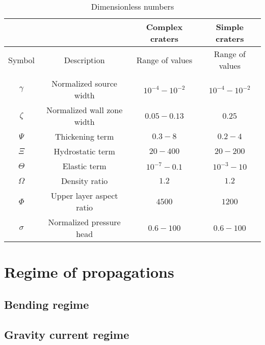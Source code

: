 	 
\begin{table}
  \caption{Dimensionless numbers}
  \centering
  \begin{tabular}{c|c|c|c}
    &&Complex craters&Simple craters \\
    \hline
    Symbol& Description & Range of values & Range of values \\
    \hline
    &&\\
    $\gamma$&Normalized source width& $10^{-4}-10^{-2}$ &$10^{-4}-10^{-2}$ \\
    $\zeta$& Normalized wall zone width  & $0.05-0.13$&$0.25$\\
    $\Psi$&Thickening term & $0.3-8$&$0.2-4$\\
    $\Xi$& Hydrostatic term & $20-400$&$20-200$\\
    $\Theta$ &Elastic term & $10^{-7}-0.1$&$10^{-3}-10$\\
    $\Omega$ & Density ratio & $1.2$ &$1.2$\\
    $\Phi$ & Upper layer aspect ratio & $4500$ &$1200 $\\
    $\sigma$&Normalized pressure head& $0.6-100$ & $0.6-100$ 
                                                   \label{tab3}
  \end{tabular} 
\end{table}

\section{Regime of propagations}
\label{sec:regime-propagations}


\subsection{Bending regime}
\label{sec:bending-regime}

\subsection{Gravity current regime}
\label{sec:grav-curr-regime}


